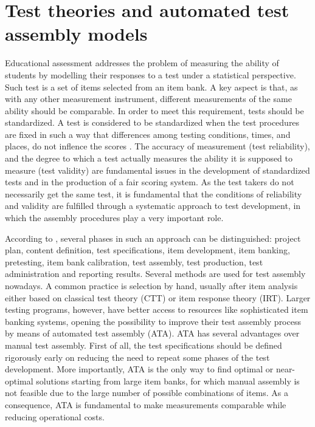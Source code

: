 \chapter{Test theories and automated test assembly models}
\label{ch:ATA}

Educational assessment addresses the problem of measuring the ability of students by modelling their responses to a test under a statistical perspective.
Such test is a set of items selected from an item bank.
A key aspect is that, as with any other measurement instrument, different measurements of the same ability should be comparable.
In order to meet this requirement, tests should be standardized.
A test is considered to be standardized when the test procedures are fixed in such a way that differences among testing conditions, times, and places, do not inflence the scores \parencite{verschoor2007genetic}.
The accuracy of measurement (test reliability), and the degree to which a test actually measures the ability it is supposed to measure (test validity) are fundamental issues in the development of standardized tests and in the production of a fair scoring system.
As the test takers do not necessarily get the same test, it is fundamental that the conditions of reliability and validity are fulfilled through a systematic approach to test development, in which the assembly procedures play a very important role.

According to \textcite{downing2006twelve}, several phases in such an approach can be distinguished: project plan, content definition, test specifications, item development, item banking, pretesting, item bank calibration, test assembly, test production, test administration and reporting results.
Several methods are used for test assembly nowadays.
A common practice is selection by hand, usually after item analysis either based on classical test theory (CTT) or item response theory (IRT).
Larger testing programs, however, have better access to resources like sophisticated item banking systems, opening the possibility to improve their test assembly process by means of automated test assembly (ATA).
ATA has several advantages over manual test assembly.
First of all, the test specifications should be defined rigorously early on reducing the need to repeat some phases of the test development.
More importantly, ATA is the only way to find optimal or near-optimal solutions starting from large item banks, for which manual assembly is not feasible due to the large number of possible combinations of items.
As a consequence, ATA is fundamental to make measurements comparable while reducing operational costs.

